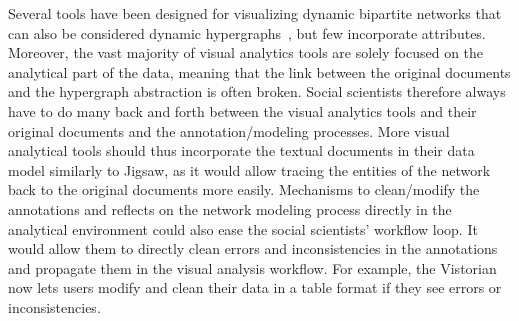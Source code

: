 


Several tools have been designed for visualizing dynamic bipartite networks that can also be considered dynamic hypergraphs~\cite{valdiviaAnalyzingDynamicHypergraphs2021, hyperstorylines}, but few incorporate attributes.
Moreover, the vast majority of visual analytics tools are solely focused on the analytical part of the data, meaning that the link between the original documents and the hypergraph abstraction is often broken.
Social scientists therefore always have to do many back and forth between the visual analytics tools and their original documents and the annotation/modeling processes.
More visual analytical tools should thus incorporate the textual documents in their data model similarly to Jigsaw\cite{Stasko}, as it would allow tracing the entities of the network back to the original documents more easily.
Mechanisms to clean/modify the annotations and reflects on the network modeling process directly in the analytical environment could also ease the social scientists' workflow loop.
It would allow them to directly clean errors and inconsistencies in the annotations and propagate them in the visual analysis workflow.
For example, the Vistorian\cite{vistorian_mini_questionnaires} now lets users modify and clean their data in a table format if they see errors or inconsistencies.


